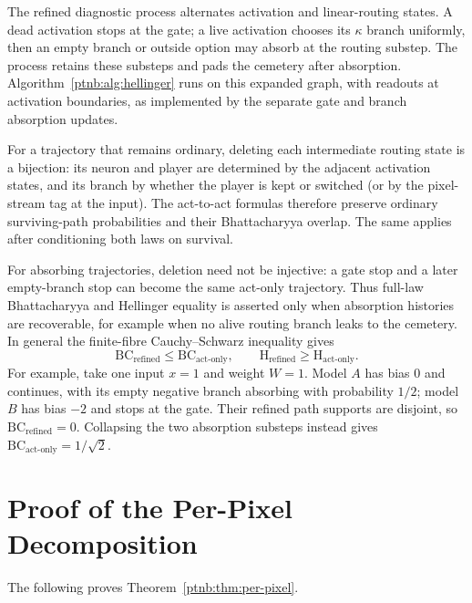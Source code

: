 \begin{remark}\label{ptnb:rem:rg-natural-equivalence}
The refined diagnostic process alternates activation and linear-routing states.
A dead activation stops at the gate; a live activation chooses its $\kappa$ branch
uniformly, then an empty branch or outside option may absorb at the routing substep.
The process retains these substeps and pads the cemetery after absorption.
Algorithm~\ref{ptnb:alg:hellinger} runs on this expanded graph, with readouts at
activation boundaries, as implemented by the separate gate and branch absorption updates.

For a trajectory that remains ordinary, deleting each intermediate routing
state is a bijection: its neuron and player are determined by the adjacent
activation states, and its branch by whether the player is kept or switched
(or by the pixel-stream tag at the input). The act-to-act formulas therefore
preserve ordinary surviving-path probabilities and their Bhattacharyya overlap.
The same applies after conditioning both laws on survival.

For absorbing trajectories, deletion need not be injective: a gate stop and a
later empty-branch stop can become the same act-only trajectory. Thus full-law
Bhattacharyya and Hellinger equality is asserted only when absorption histories
are recoverable, for example when no alive routing branch leaks to the cemetery.
In general the finite-fibre Cauchy--Schwarz inequality gives
\[
 \mathrm{BC}_{\mathrm{refined}}\leq\mathrm{BC}_{\mathrm{act\text{-}only}},
 \qquad
 \mathrm{H}_{\mathrm{refined}}\geq\mathrm{H}_{\mathrm{act\text{-}only}}.
\]
For example, take one input $x=1$ and weight $W=1$. Model $A$ has bias $0$ and
continues, with its empty negative branch absorbing with probability $1/2$;
model $B$ has bias $-2$ and stops at the gate. Their refined path supports are
disjoint, so $\mathrm{BC}_{\mathrm{refined}}=0$. Collapsing the two absorption
substeps instead gives $\mathrm{BC}_{\mathrm{act\text{-}only}}=1/\sqrt2$.\end{remark}

\section{Proof of the Per-Pixel Decomposition}

The following proves Theorem~\ref{ptnb:thm:per-pixel}.

